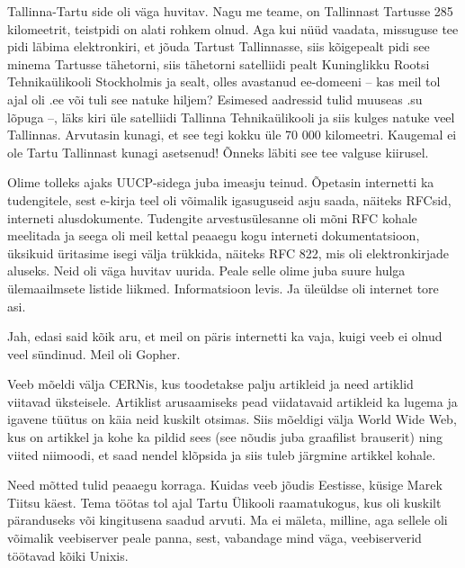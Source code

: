Tallinna-Tartu side oli väga huvitav. Nagu me teame, on Tallinnast Tartusse 285 kilomeetrit, teistpidi on alati rohkem olnud. Aga kui
nüüd vaadata, missuguse tee pidi läbima elektronkiri, et jõuda Tartust
Tallinnasse, siis kõigepealt pidi see minema Tartusse tähetorni, siis tähetorni
satelliidi pealt Kuninglikku Rootsi Tehnikaülikooli Stockholmis ja sealt, olles
avastanud ee-domeeni -- kas meil tol ajal oli .ee või tuli see natuke hiljem?
Esimesed aadressid tulid muuseas .su lõpuga --, läks kiri üle satelliidi
Tallinna Tehnikaülikooli ja siis kulges natuke veel Tallinnas. Arvutasin kunagi, et see tegi
kokku üle 70 000 kilomeetri\label{sisu!70k}. Kaugemal ei ole Tartu
Tallinnast kunagi asetsenud! Õnneks läbiti see tee valguse kiirusel.


Olime tolleks ajaks UUCP-sidega juba imeasju teinud.
Õpetasin internetti ka tudengitele, sest e-kirja teel oli
võimalik igasuguseid asju saada, näiteks RFCsid, interneti
alusdokumente. Tudengite
arvestusülesanne oli mõni RFC kohale meelitada ja seega oli meil kettal
peaaegu kogu interneti dokumentatsioon, üksikuid üritasime isegi
välja trükkida, näiteks RFC 822, mis oli elektronkirjade aluseks. Neid oli väga huvitav uurida. Peale selle olime juba suure hulga ülemaailmsete
listide liikmed. Informatsioon levis. Ja üleüldse oli internet tore asi.


Jah, edasi said kõik aru, et meil on päris internetti ka vaja, kuigi
veeb ei olnud veel sündinud. Meil oli Gopher.

Veeb mõeldi välja CERNis, kus
toodetakse palju artikleid ja need artiklid viitavad üksteisele.
Artiklist arusaamiseks pead viidatavaid artikleid ka lugema ja
igavene tüütus on käia neid kuskilt otsimas. Siis mõeldigi välja
World Wide Web, kus on artikkel ja kohe ka pildid sees (see nõudis
juba graafilist brauserit) ning viited niimoodi, et saad nendel klõpsida
ja siis tuleb järgmine artikkel kohale.


Need mõtted tulid peaaegu korraga. Kuidas veeb jõudis Eestisse,
küsige Marek Tiitsu käest. Tema töötas tol ajal Tartu
Ülikooli raamatukogus, kus oli kuskilt
päranduseks või kingitusena saadud arvuti. Ma ei mäleta, milline, aga sellele oli võimalik veebiserver peale panna, sest,
vabandage mind väga, veebiserverid töötavad kõiki Unixis.

